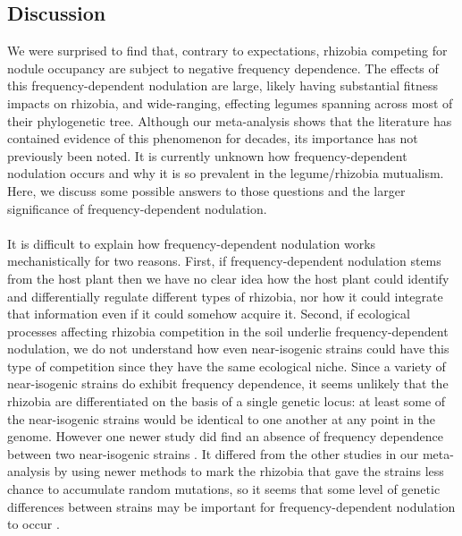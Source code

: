 \documentclass[12pt]{article}
\begin{document}
\begin{doublespace}
\subsection{Discussion}
We were surprised to find that, contrary to expectations, rhizobia competing for nodule occupancy are subject to negative frequency dependence. The effects of this frequency-dependent nodulation are large, likely having substantial fitness impacts on rhizobia, and wide-ranging, effecting legumes spanning across most of their phylogenetic tree. Although our meta-analysis shows that the literature has contained evidence of this phenomenon for decades, its importance has not previously been noted. It is currently unknown how frequency-dependent nodulation occurs and why it is so prevalent in the legume/rhizobia mutualism. Here, we discuss some possible answers to those questions and the larger significance of frequency-dependent nodulation.

\paragraph{}%
It is difficult to explain how frequency-dependent nodulation works mechanistically for two reasons. First, if frequency-dependent nodulation stems from the host plant then we have no clear idea how the host plant could identify and differentially regulate different types of rhizobia, nor how it could integrate that information even if it could somehow acquire it. Second, if ecological processes affecting rhizobia competition in the soil underlie frequency-dependent nodulation, we do not understand how even near-isogenic strains could have this type of competition since they have the same ecological niche. Since a variety of near-isogenic strains do exhibit frequency dependence, it seems unlikely that the rhizobia are differentiated on the basis of a single genetic locus: at least some of the near-isogenic strains would be identical to one another at any point in the genome. However one newer study did find an absence of frequency dependence between two near-isogenic strains \cite{Westhoek2017}. It differed from the other studies in our meta-analysis by using newer methods to mark the rhizobia that gave the strains less chance to accumulate random mutations, so it seems that some level of genetic differences between strains may be important for frequency-dependent nodulation to occur \cite{Westhoek2017}. 


\end{doublespace}
\end{document}

